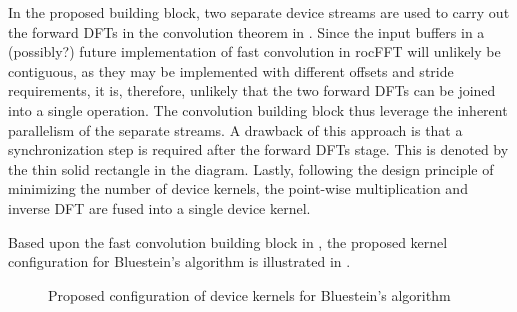 \documentclass[11pt]{scrartcl}
\begin{document}
In the proposed building block, two separate device streams are used to carry out the forward DFTs in the convolution theorem in . Since the input buffers in a (possibly?) future implementation of fast convolution in rocFFT will unlikely be contiguous, as they may be implemented with different offsets and stride requirements, it is, therefore, unlikely that the two forward DFTs can be joined into a single operation. The convolution building block thus leverage the inherent parallelism of the separate streams. A drawback of this approach is that a synchronization step is required after the forward DFTs stage. This is denoted by the thin solid rectangle in the diagram. Lastly, following the design principle of minimizing the number of device kernels, the point-wise multiplication and inverse DFT are fused into a single device kernel.

Based upon the fast convolution building block in , the proposed kernel configuration for Bluestein's algorithm is illustrated in .

\begin{figure}[H]
\centering
{}
\caption{Proposed configuration of device kernels for Bluestein's algorithm}
\label{fig:kernel_configuration_proposed}
\end{figure}
\end{document}
